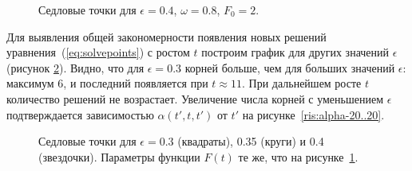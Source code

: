 \documentclass[14pt, a4paper]{article}
\numberwithin{figure}{section}
\numberwithin{equation}{section}
\begin{document}
\begin{figure}[h]
	\caption{Седловые точки для $\epsilon = 0.4$, $\omega = 0.8$, $F_0=2$.}
	\label{ris:roots1}
\end{figure}

Для выявления общей закономерности появления новых решений уравнения~(\ref{eq:solvepoints}) с ростом $t$ построим график для других значений $\epsilon$ (рисунок \ref{ris:roots2}).
Видно, что для $\epsilon = 0.3$ корней больше, чем для больших значений $\epsilon$: максимум 6, и последний появляется при $t \approx 11$.
При дальнейшем росте $t$ количество решений не возрастает.
Увеличение числа корней с уменьшением $\epsilon$ подтверждается зависимостью $\alpha(t',t,t')$ от $t'$ на рисунке~\ref{ris:alpha-20..20}.

\begin{figure}[h]
	\caption{Седловые точки для  $\epsilon = 0.3$ (квадраты), 0.35 (круги) и 0.4 (звездочки). Параметры функции $F(t)$ те же, что на рисунке~\ref{ris:roots1}. }
	\label{ris:roots2}
\end{figure}
\end{document}
